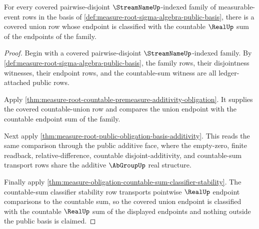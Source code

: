 \begin{theorem}
\label{thm:measure-root-countable-disjoint-additivity-public-row}
For every covered pairwise-disjoint $\StreamNameUp$-indexed family of
measurable-event rows in the basis of
\autoref{def:measure-root-sigma-algebra-public-basis}, there is a covered
union row whose endpoint is classified with the countable $\RealUp$ sum of
the endpoints of the family.
\end{theorem}
\begin{proof}
Begin with a covered pairwise-disjoint $\StreamNameUp$-indexed family. By
\autoref{def:measure-root-sigma-algebra-public-basis}, the family rows,
their disjointness witnesses, their endpoint rows, and the countable-sum
witness are all ledger-attached public rows.

Apply \autoref{thm:measure-root-countable-premeasure-additivity-obligation}.
It supplies the covered countable-union row and compares the union endpoint
with the countable endpoint sum of the family.

Next apply \autoref{thm:measure-root-public-obligation-basis-additivity}.
This reads the same comparison through the public additive face, where the
empty-zero, finite readback, relative-difference, countable
disjoint-additivity, and countable-sum transport rows share the additive
$\AbGroupUp$ real structure.

Finally apply
\autoref{thm:measure-obligation-countable-sum-classifier-stability}. The
countable-sum classifier stability row transports pointwise
$\RealUp$ endpoint comparisons to the countable sum, so the covered union
endpoint is classified with the countable $\RealUp$ sum of the displayed
endpoints and nothing outside the public basis is claimed.
\end{proof}
